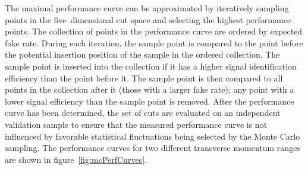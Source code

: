 The maximal performance curve can be approximated by iteratively sampling points
in the five--dimensional cut space and selecting the highest performance points.
The collection of points in the performance curve are ordered by expected fake
rate.  During each iteration, the sample point is compared to the point before
the potential insertion position of the sample in the ordered collection.  The
sample point is inserted into the collection if it has a higher signal
identification efficiency than the point before it.  The sample point is then
compared to all points in the collection after it (\ie those with a larger fake
rate); any point with a lower signal efficiency than the sample point is
removed.  After the performance curve has been determined, the set of cuts are
evaluated on an independent validation sample to ensure that the measured
performance curve is not influenced by favorable statistical fluctuations being
selected by the Monte Carlo sampling.  The performance curves for two different
transverse momentum ranges are shown in figure~\ref{fig:mcPerfCurves}.

